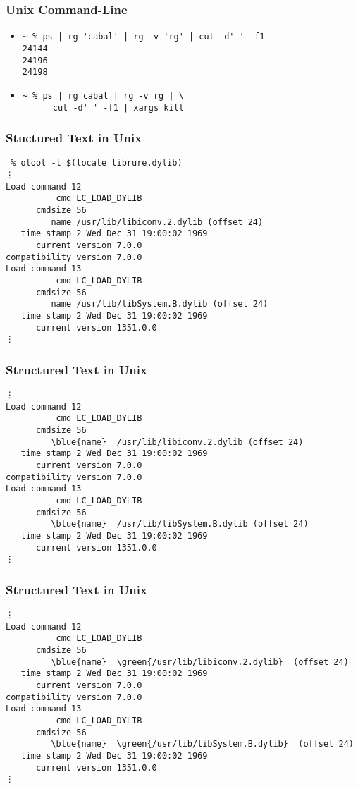 \documentclass{beamer}
\begin{document}
\begin{frame}[fragile]
  \frametitle{Unix Command-Line}
  \begin{itemize}
      \item
        \begin{verbatim}
~ % ps | rg 'cabal' | rg -v 'rg' | cut -d' ' -f1
24144
24196
24198
        \end{verbatim}
      \item
        \begin{verbatim}
~ % ps | rg cabal | rg -v rg | \
      cut -d' ' -f1 | xargs kill
        \end{verbatim}
    \end{itemize}
\end{frame}

\begin{frame}[fragile]
  \frametitle{Stuctured Text in Unix}
    \begin{verbatim}
 % otool -l $(locate librure.dylib)
⋮
Load command 12
          cmd LC_LOAD_DYLIB
      cmdsize 56
         name /usr/lib/libiconv.2.dylib (offset 24)
   time stamp 2 Wed Dec 31 19:00:02 1969
      current version 7.0.0
compatibility version 7.0.0
Load command 13
          cmd LC_LOAD_DYLIB
      cmdsize 56
         name /usr/lib/libSystem.B.dylib (offset 24)
   time stamp 2 Wed Dec 31 19:00:02 1969
      current version 1351.0.0
⋮
    \end{verbatim}

\end{frame}

\begin{frame}[fragile]
  \frametitle{Structured Text in Unix}
    \begin{Verbatim}[commandchars=\\\{\}]
 % otool -l $(locate librure.dylib)
⋮
Load command 12
          cmd LC_LOAD_DYLIB
      cmdsize 56
         \blue{name}  /usr/lib/libiconv.2.dylib (offset 24)
   time stamp 2 Wed Dec 31 19:00:02 1969
      current version 7.0.0
compatibility version 7.0.0
Load command 13
          cmd LC_LOAD_DYLIB
      cmdsize 56
         \blue{name}  /usr/lib/libSystem.B.dylib (offset 24)
   time stamp 2 Wed Dec 31 19:00:02 1969
      current version 1351.0.0
⋮
    \end{Verbatim}
\end{frame}

\begin{frame}[fragile]
  \frametitle{Structured Text in Unix}
    \begin{Verbatim}[commandchars=\\\{\}]
 % otool -l $(locate librure.dylib)
⋮
Load command 12
          cmd LC_LOAD_DYLIB
      cmdsize 56
         \blue{name}  \green{/usr/lib/libiconv.2.dylib}  (offset 24)
   time stamp 2 Wed Dec 31 19:00:02 1969
      current version 7.0.0
compatibility version 7.0.0
Load command 13
          cmd LC_LOAD_DYLIB
      cmdsize 56
         \blue{name}  \green{/usr/lib/libSystem.B.dylib}  (offset 24)
   time stamp 2 Wed Dec 31 19:00:02 1969
      current version 1351.0.0
⋮
    \end{Verbatim}
\end{frame}
\end{document}
